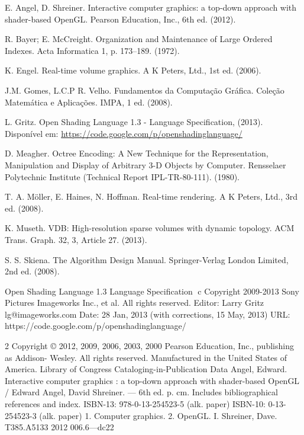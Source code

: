 \begin{thebibliography}{99}


E. Angel, D. Shreiner.  Interactive computer graphics: a top-down approach with shader-based OpenGL. Pearson Education, Inc., 6th ed. (2012).

R. Bayer; E. McCreight. Organization and Maintenance of Large Ordered Indexes. Acta Informatica 1, p. 173–189. (1972).

K. Engel. Real-time volume graphics. A K Peters, Ltd., 1st ed. (2006).

J.M. Gomes, L.C.P R. Velho. Fundamentos da Computa\c{c}\~ao Gr\'afica. Cole\c{c}\~ao Matemática e Aplica\c{c}\~oes. IMPA, 1 ed. (2008).

L. Gritz. Open Shading Language 1.3 - Language Specification, (2013). Disponível em: \url{ https://code.google.com/p/openshadinglanguage/}

D. Meagher. Octree Encoding: A New Technique for the Representation, Manipulation and Display of Arbitrary 3-D Objects by Computer. Rensselaer Polytechnic Institute (Technical Report IPL-TR-80-111). (1980).

T. A. M\"oller, E. Haines, N. Hoffman. Real-time rendering. A K Peters, Ltd., 3rd ed. (2008).

 K. Museth. VDB: High-resolution sparse volumes with dynamic topology. ACM Trans. Graph. 32, 3, Article 27. (2013).

S. S. Skiena. The Algorithm Design Manual. Springer-Verlag London Limited, 2nd ed. (2008).

\end{thebibliography}
Open Shading Language 1.3
Language Specification
⃝c Copyright 2009-2013 Sony Pictures Imageworks Inc., et al. All rights reserved.
Editor: Larry Gritz
lg@imageworks.com
Date: 28 Jan, 2013
(with corrections, 15 May, 2013)
URL: https://code.google.com/p/openshadinglanguage/

2
Copyright © 2012, 2009, 2006, 2003, 2000 Pearson Education, Inc., publishing as Addison- Wesley. All rights reserved. Manufactured in the United States of America. 
Library of Congress Cataloging-in-Publication Data
Angel, Edward.
Interactive computer graphics : a top-down approach with shader-based OpenGL /
Edward Angel, David Shreiner. — 6th ed. p. cm.
Includes bibliographical references and index.
ISBN-13: 978-0-13-254523-5 (alk. paper)
ISBN-10: 0-13-254523-3 (alk. paper)
1. Computer graphics. 2. OpenGL. I. Shreiner, Dave. T385.A5133 2012
006.6—dc22

